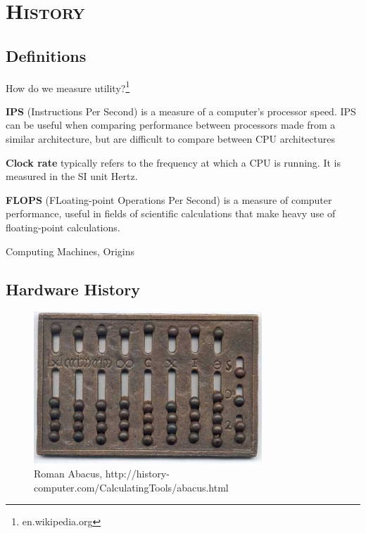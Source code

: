 \documentclass[xcolor=x11names,compress]{beamer}
\renewcommand{\(}{\begin{columns}}
\renewcommand{\)}{\end{columns}}
\newcommand{\<}[1]{\begin{column}{#1}}
\renewcommand{\>}{\end{column}}
\begin{document}
\section{\scshape History}
\subsection{Definitions}
\begin{frame}{How do we measure utility?\footnote{en.wikipedia.org}}

\textbf{IPS} (Instructions Per Second) is a measure of a computer's processor speed. IPS can be useful when comparing performance between processors made from a similar architecture, but are difficult to compare between CPU architectures

\vspace*{1 em}
\textbf{Clock rate} typically refers to the frequency at which a CPU is running. It is measured in the SI unit Hertz.

\vspace*{1 em}
\textbf{FLOPS} (FLoating-point Operations Per Second) is a measure of computer performance, useful in fields of scientific calculations that make heavy use of floating-point calculations. 
\end{frame}

\begin{frame}{Computing Machines, Origins}
\subsection{Hardware History}
\begin{figure}
\includegraphics[height=2.25in,clip]{RomanAbacus}
\caption{Roman Abacus, http://history-computer.com/CalculatingTools/abacus.html}
\end{figure}

\end{frame}
\end{document}
